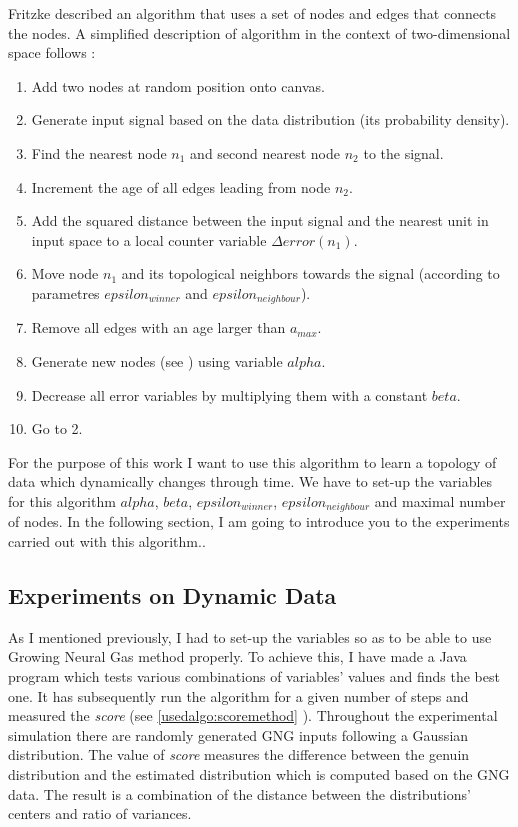 Fritzke described an algorithm that uses a set of nodes and edges that connects the nodes. A simplified description of algorithm in the context of two-dimensional space follows \cite{Fritzke:gng}:

\begin{enumerate}
\item Add two nodes at random position onto canvas.
\item Generate input signal based on the data distribution (its probability density).
\item Find the nearest node $n_1$ and second nearest node $n_2$ to the signal.
\item Increment the age of all edges leading from node $n_2$.
\item Add the squared distance between the input signal and the nearest unit in input space to a local counter variable $\Delta error(n_{1})$.
\item Move node $n_1$ and its topological neighbors towards the signal (according to parametres $epsilon_{winner}$ and $epsilon_{neighbour}$).
\item Remove all edges with an age larger than $a_{max}$.
\item Generate new nodes (see \cite{Fritzke:gng}) using variable $alpha$.
\item Decrease all error variables by multiplying them with a constant $beta$.
\item Go to 2.
\end{enumerate}

For the purpose of this work I want to use this algorithm to learn a topology of data which dynamically changes through time. We have to set-up the variables for this algorithm $alpha$, $beta$, $epsilon_{winner}$, $epsilon_{neighbour}$ and maximal number of nodes. In the following section, I am going to introduce you to the experiments carried out with this algorithm..

\subsection{Experiments on Dynamic Data}

As I mentioned previously, I had to set-up the variables so as to be able to use Growing Neural Gas method properly. To achieve this, I have made a Java program which tests various combinations of variables' values and finds the best one. It has subsequently run the algorithm for a given number of steps and measured the \emph{score} (see \ref{usedalgo:scoremethod} ). Throughout the experimental simulation there are randomly generated GNG inputs following a Gaussian distribution. The value of \emph{score} measures the difference between the genuin distribution and the estimated distribution which is computed based on the GNG data. The result is a combination of the distance between the distributions' centers and ratio of variances.

